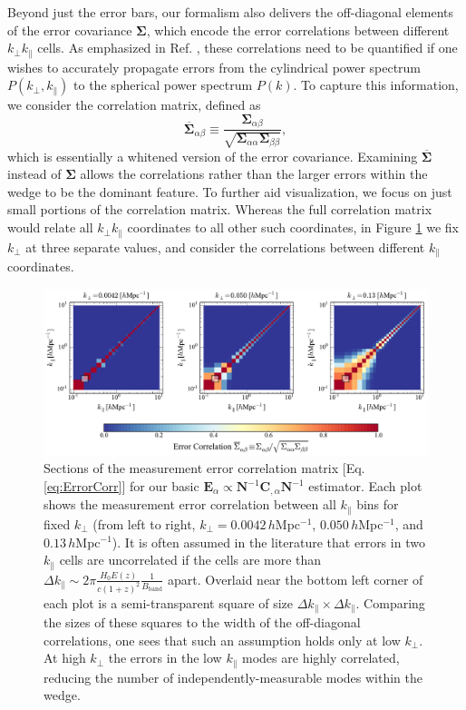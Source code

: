 \documentclass[twocolumn,aps,prd,nofootinbib,showpacs]{revtex4-1}
\begin{document}
Beyond just the error bars, our formalism also delivers the off-diagonal elements of the error covariance $\boldsymbol \Sigma$, which encode the error correlations between different $k_\perp k_\parallel$ cells.  As emphasized in Ref. \cite{Dillon2014}, these correlations need to be quantified if one wishes to accurately propagate errors from the cylindrical power spectrum $P(k_\perp, k_\parallel)$ to the spherical power spectrum $P(k)$.  To capture this information, we consider the correlation matrix, defined as
\begin{equation}
\label{eq:ErrorCorr}
\overline{\boldsymbol \Sigma}_{\alpha \beta} \equiv \frac{\boldsymbol \Sigma_{\alpha \beta}}{\sqrt{\boldsymbol \Sigma_{\alpha \alpha} \boldsymbol \Sigma_{\beta \beta}}},
\end{equation}
which is essentially a whitened version of the error covariance.  Examining $\overline{\boldsymbol \Sigma}$ instead of $\boldsymbol \Sigma$ allows the correlations rather than the larger errors within the wedge to be the dominant feature.  To further aid visualization, we focus on just small portions of the correlation matrix.  Whereas the full correlation matrix would relate all $k_\perp k_\parallel$ coordinates to all other such coordinates, in Figure \ref{fig:basicEstCovar} we fix $k_\perp$ at three separate values, and consider the correlations between different $k_\parallel$ coordinates.

\begin{figure}[!ht] 
	\centering 
	\includegraphics[width=1\textwidth]{figures/simpleEstCovar.pdf}
	\caption{Sections of the measurement error correlation matrix [Eq. \eqref{eq:ErrorCorr}] for our basic $\mathbf{E}_\alpha \propto \mathbf{N}^{-1} \mathbf{C}_{,\alpha} \mathbf{N}^{-1}$ estimator.  Each plot shows the measurement error correlation between all $k_\parallel$ bins for fixed $k_\perp$ (from left to right, $k_\perp = 0.0042\,h$Mpc$^{-1}$, $0.050\,h$Mpc$^{-1}$, and $0.13\,h$Mpc$^{-1}$).  It is often assumed in the literature that errors in two $k_\parallel$ cells are uncorrelated if the cells are more than $\Delta k_\parallel \sim 2\pi \frac{ H_0 E(z)}{c (1+z)^2} \frac{1}{B_\textrm{band}}$ apart.  Overlaid near the bottom left corner of each plot is a semi-transparent square of size $\Delta k_\parallel \times \Delta k_\parallel$.  Comparing the sizes of these squares to the width of the off-diagonal correlations, one sees that such an assumption holds only at low $k_\perp$.  At high $k_\perp$ the errors in the low $k_\parallel$ modes are highly correlated, reducing the number of independently-measurable modes within the wedge.}
	\label{fig:basicEstCovar}
\end{figure} 
\end{document}
